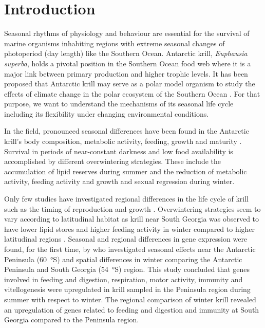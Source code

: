 \section{Introduction}

Seasonal rhythms of physiology and behaviour are essential for the survival of
marine organisms inhabiting regions with extreme seasonal changes of
photoperiod (day length) like the Southern Ocean. Antarctic krill,
\textit{Euphausia superba}, holds a pivotal position in the Southern Ocean food
web where it is a major link between primary production and higher trophic
levels. It has been proposed that Antarctic krill may serve as a polar model
organism to study the effects of climate change in the polar ecosystem of the
Southern Ocean \citep{meyer_seasonal_2010}. For that purpose, we want to
understand the mechanisms of its seasonal life cycle including its flexibility
under changing environmental conditions.

In the field, pronounced seasonal differences have been found in the Antarctic
krill's body composition, metabolic activity, feeding, growth
\citep{meyer_seasonal_2010} and maturity \citep{siegel_krill_2012}. Survival in
periods of near-constant darkness and low food availability is accomplished by
different overwintering strategies. These include the accumulation of lipid
reserves during summer and the reduction of metabolic activity, feeding
activity and growth \citep{meyer_performance_2012} and sexual regression during
winter.

Only few studies have investigated regional differences in the life cycle of
krill such as the timing of reproduction \citep{spiridonov_spatial_1995} and
growth \citep{kawaguchi_modelling_2006}. Overwintering strategies seem to vary
according to latitudinal habitat as krill near South Georgia was observed to
have lower lipid stores and higher feeding activity in winter compared to
higher latitudinal regions \citep{schmidt_feeding_2014}. Seasonal and regional
differences in gene expression were found, for the first time, by
\citet{seear_seasonal_2012} who investigated seasonal effects near the
Antarctic Peninsula (\SI{60}{\degree}S) and spatial differences in winter
comparing the Antarctic Peninsula and South Georgia (\SI{54}{\degree}S) region.
This study concluded that genes involved in feeding and digestion, respiration,
motor activity, immunity and vitellogenesis were upregulated in krill sampled
in the Peninsula region during summer with respect to winter. The regional
comparison of winter krill revealed an upregulation of genes related to feeding
and digestion and immunity at South Georgia compared to the Peninsula region.

